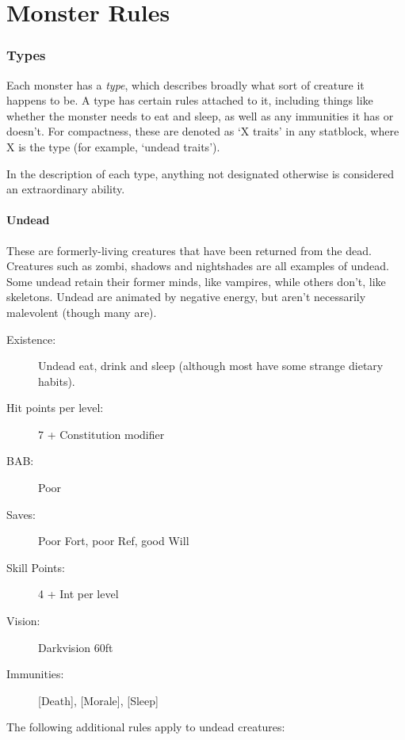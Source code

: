 \documentclass[10pt]{article}
\begin{document}
\part{Monster Rules}

\section{Types}

Each monster has a {\em type}, which describes broadly what sort of creature it happens to be. A type has certain rules attached to it, including things like whether the monster needs to eat and sleep, as well as any immunities it has or doesn't. For compactness, these are denoted as `X traits' in any statblock, where X is the type (for example, `undead traits').

In the description of each type, anything not designated otherwise is considered an extraordinary ability.

\subsection{Undead}

These are formerly-living creatures that have been returned from the dead. Creatures such as zombi, shadows and nightshades are all examples of undead. Some undead retain their former minds, like vampires, while others don't, like skeletons. Undead are animated by negative energy, but aren't necessarily malevolent (though many are). 

\begin{description}
\item[Existence:] Undead eat, drink and sleep (although most have some strange dietary habits).
\item[Hit points per level:] 7 + Constitution modifier
\item[BAB:] Poor
\item[Saves:] Poor Fort, poor Ref, good Will
\item[Skill Points:] 4 + Int per level
\item[Vision:] Darkvision 60ft
\item[Immunities:] [Death], [Morale], [Sleep]
\end{description}

The following additional rules apply to undead creatures:
\end{document}
